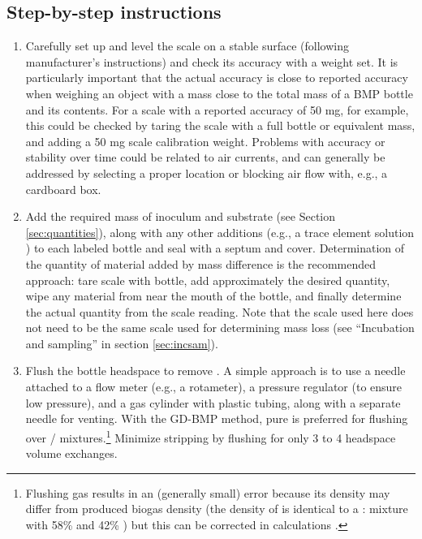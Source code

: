 \documentclass[]{article}
\begin{document}
\subsection{Step-by-step instructions}
\begin{enumerate}
  \item Carefully set up and level the scale on a stable surface (following manufacturer's instructions) and check its accuracy with a weight set. 
      It is particularly important that the actual accuracy is close to reported accuracy when weighing an object with a mass close to the total mass of a BMP bottle and its contents. 
      For a scale with a reported accuracy of 50 mg, for example, this could be checked by taring the scale with a full bottle or equivalent mass, and adding a 50 mg scale calibration weight.
      Problems with accuracy or stability over time could be related to air currents, and can generally be addressed by selecting a proper location or blocking air flow with, e.g., a cardboard box.
    \item Add the required mass of inoculum and substrate (see Section \ref{sec:quantities}), along with any other additions (e.g., a trace element solution \citep{holligerStandardizationBiomethanePotential2016}) to each labeled bottle and seal with a septum and cover. 
      Determination of the quantity of material added by mass difference is the recommended approach: tare scale with bottle, add approximately the desired quantity, wipe any material from near the mouth of the bottle, and finally determine the actual quantity from the scale reading. 
      Note that the scale used here does not need to be the same scale used for determining mass loss (see ``Incubation and sampling'' in section \ref{sec:incsam}).
    \item Flush the bottle headspace to remove . 
      A simple approach is to use a needle attached to a flow meter (e.g., a rotameter), a pressure regulator (to ensure low pressure), and a gas cylinder with plastic tubing, along with a separate needle for venting. With the GD-BMP method, pure  is preferred for flushing over / mixtures.\footnote{
        Flushing gas results in an (generally small) error because its density may differ from produced biogas density (the density of  is identical to a : mixture with 58\%  and 42\% ) but this can be corrected in calculations \citep{justesenDevelopmentValidationLowcost2019}.
} 
      Minimize  stripping by flushing for only 3 to 4 headspace volume exchanges. 

\end{enumerate}
\end{document}
